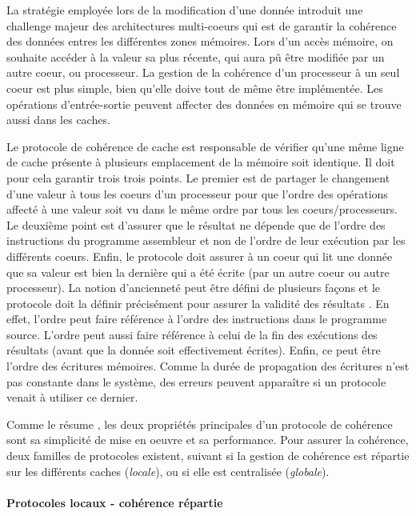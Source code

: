 La stratégie employée lors de la modification d'une donnée introduit une challenge majeur des architectures multi-coeurs qui est de garantir la cohérence des données entres les différentes zones mémoires. Lors d'un accès mémoire, on souhaite accéder à la valeur sa plus récente, qui aura pû être modifiée par un autre coeur, ou processeur. La gestion de la cohérence d'un processeur à un seul coeur est plus simple, bien qu'elle doive tout de même être implémentée. Les opérations d'entrée-sortie peuvent affecter des données en mémoire qui se trouve aussi dans les caches.

Le protocole de cohérence de cache est responsable de vérifier qu'une même ligne de cache présente à plusieurs emplacement de la mémoire soit identique. Il doit pour cela garantir trois trois points. Le premier est de partager le changement d'une valeur à tous les coeurs d'un processeur pour que l'ordre des opérations affecté à une valeur soit vu dans le même ordre par tous les coeurs/processeurs. Le deuxième point est d'assurer que le résultat ne dépende que de l'ordre des instructions du programme assembleur et non de l'ordre de leur exécution par les différents coeurs. Enfin, le protocole doit assurer à un coeur qui lit une donnée que sa valeur est bien la dernière qui a été écrite (par un autre coeur ou autre processeur). La notion d'ancienneté peut être défini de plusieurs façons et le protocole doit la définir précisément pour assurer la validité des résultats \cite{Blanchet2013}. En effet, l'ordre peut faire référence à l'ordre des instructions dans le programme source. L'ordre peut aussi faire référence à celui de la fin des exécutions des résultats (avant que la donnée soit effectivement écrites). Enfin, ce peut être l'ordre des écritures mémoires. Comme la durée de propagation des écritures n'est pas constante dans le système, des erreurs peuvent apparaître si un protocole venait à utiliser ce dernier.

Comme le résume \cite{Blanchet2013}, les deux propriétés principales d'un protocole de cohérence sont sa simplicité de mise en oeuvre et sa performance. Pour assurer la cohérence, deux familles de protocoles existent, suivant si la gestion de cohérence est répartie sur les différents caches (\textit{locale}), ou si elle est centralisée (\textit{globale}). 



\paragraph{Protocoles locaux - cohérence répartie}

